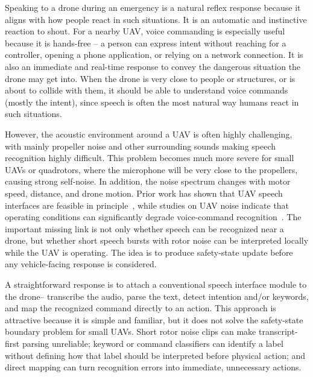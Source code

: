 Speaking to a drone during an emergency is a natural reflex response because it aligns with how people react in such situations. It is an automatic and instinctive reaction to shout. For a nearby UAV, voice commanding is especially useful because it is hands-free -- a person can express intent without reaching for a controller, opening a phone application, or relying on a network connection. It is also an immediate and real-time response to convey the dangerous situation the drone may get into. When the drone is very close to people or structures, or is about to collide with them, it should be able to understand voice commands (mostly the intent), since speech is often the most natural way humans react in such situations.

However, the acoustic environment around a UAV is often highly challenging, with mainly propeller noise and other surrounding sounds making speech recognition highly difficult. This problem becomes much more severe for small UAVs or quadrotors, where the microphone will be very close to the propellers, causing strong self-noise. In addition, the noise spectrum changes with motor speed, distance, and drone motion. Prior work has shown that UAV speech interfaces are feasible in principle~\cite{oneata19_interspeech,oneata2021multimodal}, while studies on UAV noise indicate that operating conditions can significantly degrade voice-command recognition~\cite{miesikowska2021uavnoise,park2023uavvehicle}. The important missing link is not only whether speech can be recognized near a drone, but whether short speech bursts with rotor noise can be interpreted locally while the UAV is operating. The idea is to produce  safety-state update before any vehicle-facing response is considered.

A straightforward response is to attach a conventional speech interface module to the drone-- transcribe the audio, parse the text, detect intention and/or keywords, and map the recognized command directly to an action. This approach is attractive because it is simple and familiar, but it does not solve the safety-state boundary problem for small UAVs. Short rotor noise clips can make transcript-first parsing unreliable; keyword or command classifiers can identify a label without defining how that label should be interpreted before physical action; and direct mapping can turn recognition errors into immediate, unnecessary actions.


